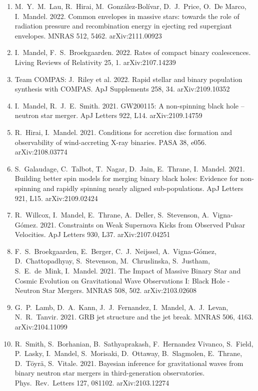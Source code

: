 \documentclass[margin,line]{res}
\begin{document}
\begin{resume}
\begin{enumerate}
\item M.~Y.~M.~Lau, R.~Hirai, M.~Gonz\'alez-Bol\'ivar, D.~J.~Price, O.~De Marco, I.~Mandel. 2022. Common envelopes in massive stars: towards the role of radiation pressure and recombination energy in ejecting red supergiant envelopes. MNRAS 512, 5462.  arXiv:2111.00923

\item I.~Mandel, F.~S.~Broekgaarden. 2022. Rates of compact binary coalescences.  Living Reviews of Relativity 25, 1.  arXiv:2107.14239

\item Team COMPAS: J.~Riley et al. 2022.  Rapid stellar and binary population synthesis with COMPAS.  ApJ Supplements 258, 34.  arXiv:2109.10352

\item I.~Mandel, R.~J.~E.~Smith.  2021.  GW200115: A non-spinning black hole -- neutron star merger.  ApJ Letters 922, L14. arXiv:2109.14759

\item R.~Hirai, I.~Mandel. 2021. Conditions for accretion disc formation and observability of wind-accreting X-ray binaries. PASA 38, e056.  arXiv:2108.03774 

\item S.~Galaudage, C.~Talbot, T.~Nagar, D.~Jain, E.~Thrane, I.~Mandel.  2021. Building better spin models for merging binary black holes: Evidence for non-spinning and rapidly spinning nearly aligned sub-populations. ApJ Letters 921, L15.  arXiv:2109.02424

\item R.~Willcox, I.~Mandel, E.~Thrane, A.~Deller, S.~Stevenson, A.~Vigna-G{\'o}mez.  2021. Constraints on Weak Supernova Kicks from Observed Pulsar Velocities.  ApJ Letters 930, L37.  arXiv:2107.04251 

\item F.~S.~Broekgaarden, E.~Berger, C.~J.~Neijssel, A.~Vigna-G\'{o}mez, D.~Chattopadhyay, S.~Stevenson, M.~Chruslinska, S.~Justham, S.~E.~de~Mink, I.~Mandel. 2021. The Impact of Massive Binary Star and Cosmic Evolution on Gravitational Wave Observations I: Black Hole - Neutron Star Mergers.  MNRAS 508, 502. arXiv:2103.02608

\item G.~P.~Lamb, D.~A.~Kann, J.~J.~Fernandez, I.~Mandel, A.~J.~Levan, N.~R.~Tanvir. 2021. GRB jet structure and the jet break. MNRAS 506, 4163.  arXiv:2104.11099

\item R.~Smith, S.~Borhanian, B.~Sathyaprakash, F.~Hernandez Vivanco, S.~Field, P.~Lasky, I.~Mandel, S.~Morisaki, D.~Ottaway, B.~Slagmolen, E.~Thrane, D.~T\"{o}yr\"{a}, S.~Vitale.  2021.  Bayesian inference for gravitational waves from binary neutron star mergers in third-generation observatories.  Phys.~Rev.~Letters 127, 081102. arXiv:2103.12274


\end{enumerate}
\end{resume}
\end{document}
